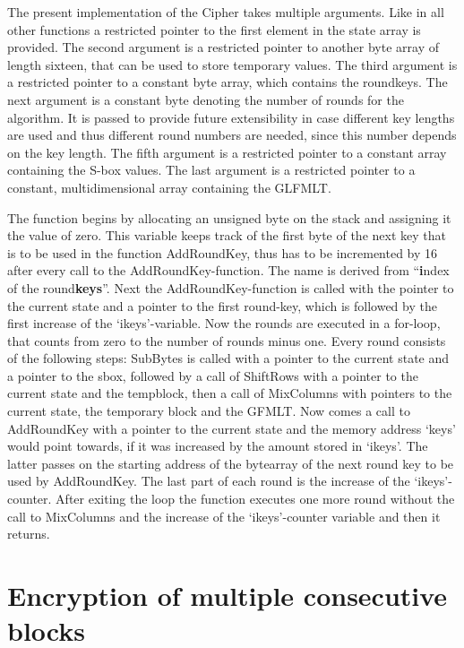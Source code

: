 The present implementation of the Cipher takes multiple arguments. Like
in all other functions a restricted pointer to the first element in the
state array is provided. The second argument is a restricted pointer to
another byte array of length sixteen, that can be used to store temporary
values. The third argument is a restricted pointer to a constant
byte array, which contains the roundkeys. The next argument is a constant
byte denoting the number of rounds for the algorithm. It is passed to
provide future extensibility in case different key lengths are used and
thus different round numbers are needed, since this number depends on
the key length. The fifth argument is a restricted pointer to a constant
array containing the S-box values. The last argument is a restricted
pointer to a constant, multidimensional array containing the GLFMLT.

The function begins by allocating an unsigned byte on the stack and
assigning it the value of zero. This variable keeps track of the first
byte of the next key that is to be used in the function AddRoundKey,
thus has to be incremented by 16 after every call to the
AddRoundKey-function. The name is derived from ``\textbf{i}ndex of the
round\textbf{keys}''. Next the AddRoundKey-function is called with the
pointer to the current state and a pointer to the first round-key, which
is followed by the first increase of the `ikeys'-variable. Now the
rounds are executed in a for-loop, that counts from zero to the number
of rounds minus one. Every round consists of the following steps:
SubBytes is called with a pointer to the current state and a pointer to
the sbox, followed by a call of ShiftRows with a pointer to the current
state and the tempblock, then a call of MixColumns with pointers to the
current state, the temporary block and the GFMLT. Now comes a call to
AddRoundKey with a pointer to the current state and the memory address
`keys' would point towards, if it was increased by the amount stored in
`ikeys'. The latter passes on the starting address of the bytearray of
the next round key to be used by AddRoundKey. The last part of each
round is the increase of the `ikeys'-counter. After exiting the loop the
function executes one more round without the call to MixColumns and the
increase of the `ikeys'-counter variable and then it returns.

\hypertarget{encryption-of-multiple-consecutive-blocks}{%
\section{Encryption of multiple consecutive
blocks}\label{encryption-of-multiple-consecutive-blocks}}

